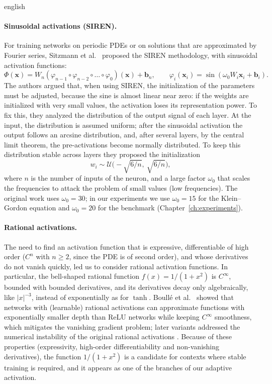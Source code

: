 \documentclass[11pt,letterpaper,twoside,openright]{book} %
\newcommand{\abs}[1]{\left\lvert #1 \right\rvert}
\begin{document}
\begin{hyphenrules}{english}
\paragraph{Sinusoidal activations (SIREN).}
For training networks on periodic PDEs or on solutions that are approximated by Fourier series,
Sitzmann et al.~\cite{sitzmann2020} proposed the SIREN methodology, with sinusoidal activation functions:
\begin{equation}
  \Phi(\mathbf{x})=W_n(\varphi_{n-1}\circ\varphi_{n-2}\circ\dots\circ\varphi_0)(\mathbf{x})+\mathbf{b}_n,\qquad
  \varphi_i(\mathbf{x}_i)=\sin(\omega_0W_i\mathbf{x}_i+\mathbf{b}_i).
  \label{eq:siren}
\end{equation}
The authors argued that, when using SIREN, the initialization of the parameters must be adjusted, because
the sine is almost linear near zero: if the weights are initialized with very small values, the activation
loses its representation power. To fix this, they analyzed the distribution of the output signal of each
layer. At the input, the distribution is assumed uniform; after the sinusoidal activation the output
follows an arcsine distribution, and, after several layers, by the central limit theorem, the
pre-activations become normally distributed. To keep this distribution stable across layers they proposed
the initialization
\begin{equation}
  w_i\sim\mathcal{U}\Big(-\sqrt{6/n},\ \sqrt{6/n}\Big),
  \label{eq:siren-init}
\end{equation}
where $n$ is the number of inputs of the neuron, and a large factor $\omega_0$ that scales the frequencies
to attack the problem of small values (low frequencies). The original work uses $\omega_0=30$; in our
experiments we use $\omega_0=15$ for the Klein--Gordon equation and $\omega_0=20$ for the benchmark
(Chapter~\ref{ch:experiments}).

\paragraph{Rational activations.}
The need to find an activation function that is expressive, differentiable of high order ($C^n$ with
$n\ge2$, since the PDE is of second order), and whose derivatives do not vanish quickly, led us to
consider rational activation functions. In particular, the bell-shaped rational function
$f(x)=1/(1+x^2)$ is $C^\infty$, bounded with bounded derivatives, and its derivatives decay only
algebraically, like $\abs{x}^{-3}$, instead of exponentially as for $\tanh$. Boull{\'e} et al.~\cite{boulle2020} showed
that networks with (learnable) rational activations can approximate functions with exponentially smaller
depth than ReLU networks while keeping $C^\infty$ smoothness, which mitigates the vanishing gradient
problem; later variants addressed the numerical instability of the original rational activations
\cite{dubey2022}. Because of these properties (expressivity, high-order differentiability and
non-vanishing derivatives), the function $1/(1+x^2)$ is a candidate for contexts where stable training is
required, and it appears as one of the branches of our adaptive activation.


\end{hyphenrules}
\end{document}
